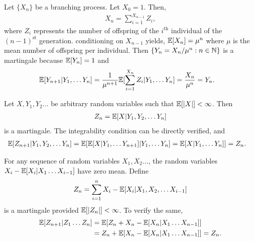 \documentclass[a4paper,10pt,english]{article}
\begin{document}
\begin{exmp} 
Let $\{X_n\}$ be a branching process. Let $X_0=1$. Then,
\begin{align*}
X_n = \sum_{i=1}^{X_{n-1}}Z_i,
\end{align*}
where $Z_i$ represents the number of offspring of the $i^{\text{th}}$ individual of the $(n-1)^{\text{st}}$ generation. conditioning on $X_{n-1}$ yields, $\mathbb{E}[X_n]= \mu^n$ where $\mu$ is the mean number of offspring per individual. Then $\{Y_n = X_n / \mu^n: n \in \mathbb{N}\}$ is a martingale because $\mathbb{E}[Y_n]= 1$ and 
\begin{align*}
\E[Y_{n+1}|Y_1, \hdots Y_n] %
&= \frac{1}{\mu^{n+1}}\E[\sum_{i=1}^{X_{n}}Z_i|Y_1, \hdots Y_n]
= \frac{X_n}{\mu^n}=Y_n.
\end{align*}
\end{exmp}
\begin{exmp} 
Let $X,Y_1,Y_2 \hdots$ be arbitrary random variables such that $\mathbb{E}[|X|]< \infty$. Then
\begin{align*}
Z_n =\mathbb{E}[X|Y_1,Y_2, \hdots Y_n]
\end{align*}
is a martingale. The integrability condition can be directly verified, and
\begin{align*}
\mathbb{E}[Z_{n+1}|Y_1,Y_2, \hdots Y_n]&= \mathbb{E}[\mathbb{E}[X|Y_1,\hdots Y_{n+1}]|Y_1,\hdots Y_{n}] = \mathbb{E}[X|Y_1,\hdots Y_{n}]]=Z_n.
\end{align*} 
\end{exmp}
\begin{exmp}
For any sequence of random variables $X_1,X_2 \hdots $, the random variables $X_i-\mathbb{E}[X_i|X_1 \hdots X_{i-1}]$ have zero mean. Define
\begin{align*}
Z_n =\sum_{i=1}^n X_i -\mathbb{E}[X_i|X_1,X_2, \hdots X_{i-1}] 
\end{align*}
 is  a martingale provided $\mathbb{E}[|Z_n|]< \infty$.  To verify the same, 
 \begin{align*}
\mathbb{E}[Z_{n+1}|Z_1 \hdots Z_n]&= \mathbb{E}[Z_n+X_n-\mathbb{E}[X_n|X_1 \hdots X_{n-1}]]\\
&= Z_n+\mathbb{E}[X_n-\mathbb{E}[X_n|X_1 \hdots X_{n-1}]]=Z_n.\\
\end{align*}
\end{exmp}
\end{document}
